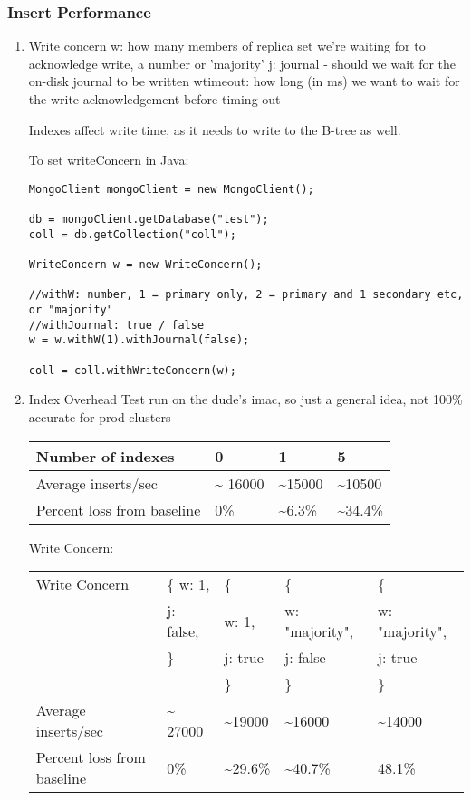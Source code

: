 \documentclass[11pt]{article}
\begin{document}
\subsubsection{Insert Performance}
\label{sec:orgc690189}
\begin{enumerate}
\item Write concern
\label{sec:org0e13963}
w: how many members of replica set we're waiting for to acknowledge write, a number or 'majority'
j: journal - should we wait for the on-disk journal to be written
wtimeout: how long (in ms) we want to wait for the write acknowledgement before timing out

Indexes affect write time, as it needs to write to the B-tree as well.

To set writeConcern in Java:
\begin{verbatim}
MongoClient mongoClient = new MongoClient();

db = mongoClient.getDatabase("test");
coll = db.getCollection("coll");

WriteConcern w = new WriteConcern();

//withW: number, 1 = primary only, 2 = primary and 1 secondary etc, or "majority"
//withJournal: true / false
w = w.withW(1).withJournal(false);

coll = coll.withWriteConcern(w);

\end{verbatim}

\item Index Overhead
\label{sec:org587059f}
Test run on the dude's imac, so just a general idea, not 100\% accurate for prod clusters

\begin{center}
\begin{tabular}{llll}
Number of indexes & 0 & 1 & 5\\
\hline
Average inserts/sec & \textasciitilde{} 16000 & \textasciitilde{}15000 & \textasciitilde{}10500\\
\hline
Percent loss from baseline & 0\% & \textasciitilde{}6.3\% & \textasciitilde{}34.4\%\\
\hline
\end{tabular}
\end{center}


Write Concern:

\begin{center}
\begin{tabular}{lllll}
Write Concern & \{ w: 1, & \{ & \{ & \{\\
 & j: false, & w: 1, & w: "majority", & w: "majority",\\
 & \} & j: true & j: false & j: true\\
 &  & \} & \} & \}\\
\hline
Average inserts/sec & \textasciitilde{} 27000 & \textasciitilde{}19000 & \textasciitilde{}16000 & \textasciitilde{}14000\\
\hline
Percent loss from baseline & 0\% & \textasciitilde{}29.6\% & \textasciitilde{}40.7\% & 48.1\%\\
\hline
\end{tabular}
\end{center}
\end{enumerate}
\end{document}
